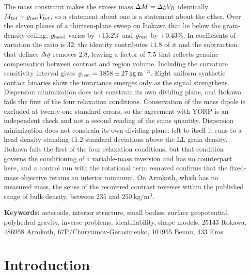 {The mass constraint makes the excess mass $\Delta M=\Delta\varrho V_{R}$ identically
$M_{\mathrm{tot}}-\varrho_{\mathrm{rest}}V_{\mathrm{tot}}$, so a statement about one is a statement about the
other. Over the eleven planes of a thirteen-plane sweep on Itokawa that lie
below the grain-density ceiling, $\varrho_{\mathrm{head}}$ varies by $\pm13.2\%$ and
$\varrho_{\mathrm{rest}}$ by $\pm0.43\%$. In coefficients of variation the ratio is $32$;
the identity contributes $11.8$ of it and the subtraction that defines
$\Delta\varrho$ removes $2.8$, leaving a factor of $7.5$ that reflects genuine
compensation between contrast and region volume. Including the curvature sensitivity interval
gives $\varrho_{\mathrm{rest}}=1858\pm\SI{27}{\kilo\gram\per\cubic\metre}$.
Eight uniform synthetic contact binaries show the invariance emerges
only as the signal strengthens. Dispersion minimization does not
constrain its own dividing plane, and Itokawa fails the first of the
four relaxation conditions. Conservation of the mass dipole is excluded at twenty-one standard errors,
so the agreement with YORP is an independent check and not a second reading
of the same quantity. Dispersion minimization does not constrain its own
dividing plane: left to itself it runs to a head density standing $11.2$
standard deviations above the LL grain density. Itokawa fails the first of
the four relaxation conditions, but that condition governs the conditioning
of a variable-mass inversion and has no counterpart here, and a control run
with the rotational term removed confirms that the fixed-mass objective
retains an interior minimum. On Arrokoth, which has no measured mass, the
sense of the recovered contrast reverses within the published range of bulk
density, between $235$ and $\SI{250}{\kilo\gram\per\cubic\metre}$.



}

\medskip
\noindent\textbf{Keywords:} 
asteroids,
interior structure,
small bodies,
surface geopotential,
polyhedral gravity,
inverse problems,
identifiability,
shape models,
25143 Itokawa,
486958 Arrokoth,
67P/Churyumov-Gerasimenko,
101955 Bennu,
433 Eros


\section{Introduction}
\label{sec:intro}

